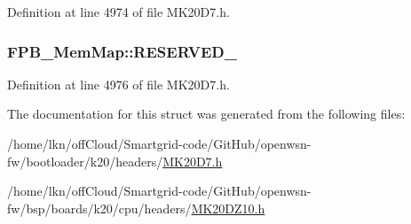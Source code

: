 Definition at line 4974 of file M\+K20\+D7.\+h.

\subsubsection[{\texorpdfstring{R\+E\+S\+E\+R\+V\+E\+D\+\_\+0}{RESERVED_0}}]{ F\+P\+B\+\_\+\+Mem\+Map\+::\+R\+E\+S\+E\+R\+V\+E\+D\+\_}\hypertarget{struct_f_p_b___mem_map_ab84652bcc7513fd0d7cb7800d0de0a7d}{}\label{struct_f_p_b___mem_map_ab84652bcc7513fd0d7cb7800d0de0a7d}


Definition at line 4976 of file M\+K20\+D7.\+h.



The documentation for this struct was generated from the following files\+:\begin{DoxyCompactItemize}
\item 
/home/lkn/off\+Cloud/\+Smartgrid-\/code/\+Git\+Hub/openwsn-\/fw/bootloader/k20/headers/\hyperlink{bootloader_2k20_2headers_2_m_k20_d7_8h}{M\+K20\+D7.\+h}\item 
/home/lkn/off\+Cloud/\+Smartgrid-\/code/\+Git\+Hub/openwsn-\/fw/bsp/boards/k20/cpu/headers/\hyperlink{_m_k20_d_z10_8h}{M\+K20\+D\+Z10.\+h}\end{DoxyCompactItemize}
